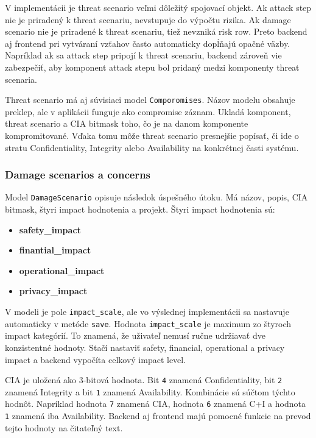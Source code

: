 \documentclass[11pt]{article}
\begin{document}
V implementácii je threat scenario veľmi dôležitý spojovací objekt. Ak attack step nie je priradený k threat scenariu, nevstupuje do výpočtu rizika. Ak damage scenario nie je priradené k threat scenariu, tiež nevzniká risk row. Preto backend aj frontend pri vytváraní vzťahov často automaticky dopĺňajú opačné väzby. Napríklad ak sa attack step pripojí k threat scenariu, backend zároveň vie zabezpečiť, aby komponent attack stepu bol pridaný medzi komponenty threat scenaria.

Threat scenario má aj súvisiaci model \texttt{Comporomises}. Názov modelu obsahuje preklep, ale v aplikácii funguje ako compromise záznam. Ukladá komponent, threat scenario a CIA bitmask toho, čo je na danom komponente kompromitované. Vďaka tomu môže threat scenario presnejšie popísať, či ide o stratu Confidentiality, Integrity alebo Availability na konkrétnej časti systému.

\subsubsection{Damage scenarios a concerns}

Model \texttt{DamageScenario} opisuje následok úspešného útoku. Má názov, popis, CIA bitmask, štyri impact hodnotenia a projekt. Štyri impact hodnotenia sú:

\begin{itemize}
    \item \textbf{safety\_impact}
    \item \textbf{finantial\_impact}
    \item \textbf{operational\_impact}
    \item \textbf{privacy\_impact}
\end{itemize}

V modeli je pole \texttt{impact\_scale}, ale vo výslednej implementácii sa nastavuje automaticky v metóde \texttt{save}. Hodnota \texttt{impact\_scale} je maximum zo štyroch impact kategórií. To znamená, že uživateľ nemusí ručne udržiavať dve konzistentné hodnoty. Stačí nastaviť safety, financial, operational a privacy impact a backend vypočíta celkový impact level.

CIA je uložená ako 3-bitová hodnota. Bit \texttt{4} znamená Confidentiality, bit \texttt{2} znamená Integrity a bit \texttt{1} znamená Availability. Kombinácie sú súčtom týchto hodnôt. Napríklad hodnota \texttt{7} znamená CIA, hodnota \texttt{6} znamená C+I a hodnota \texttt{1} znamená iba Availability. Backend aj frontend majú pomocné funkcie na prevod tejto hodnoty na čitateľný text.
\end{document}
